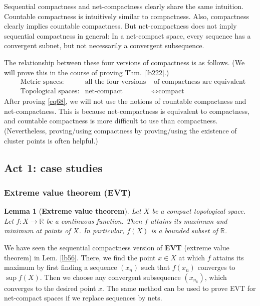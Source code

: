 \documentclass[12pt,b5paper,notitlepage]{article}
\theoremstyle{definition}
\theoremstyle{plain}
\newtheorem{lm}[df]{Lemma}
\newcommand{\Rbb}{\mathbb R}
\numberwithin{equation}{section}
\begin{document}
Sequential compactness and net-compactness clearly share the same intuition. Countable compactness is intuitively similar to compactness. Also, compactness clearly implies countable compactness. But net-compactness does not imply sequential compactness in general: In a net-compact space, every sequence has a convergent subnet, but not necessarily a convergent subsequence. 

The relationship between these four versions of compactness is as follows. (We will prove this in the course of proving Thm. \ref{lb222}.)
\begin{subequations}\label{eq68}
\begin{align}
&\text{Metric spaces:} & \text{all the four versions}&\text{ of compactness are equivalent}\\
&\text{Topological spaces:} & \text{net-compact}&\Longleftrightarrow\text{compact}
\end{align}
\end{subequations}
After proving \eqref{eq68}, we will not use the notions of countable compactness and net-compactness. This is because net-compactness is equivalent to compactness, and countable compactness is more difficult to use than compactness. (Nevertheless, proving/using compactness by proving/using the existence of cluster points is often helpful.)




\subsection{Act 1: case studies}\label{lb293}



\subsubsection{Extreme value theorem (EVT)}

\begin{lm}[\textbf{Extreme value theorem}]\label{lb224} 
Let $X$ be a compact topological space. Let $f:X\rightarrow\Rbb$ be a continuous function. Then $f$ attains its maximum and minimum at points of $X$. In particular, $f(X)$ is a bounded subset of $\Rbb$.
\end{lm}



We have seen the sequential compactness version of \textbf{EVT} (extreme value theorem) in Lem. \ref{lb56}. There, we find the point $x\in X$ at which $f$ attains its maximum by first finding a sequence $(x_n)$ such that $f(x_n)$ converges to $\sup f(X)$. Then we choose any convergent subsequence $(x_{n_k})$, which converges to the desired point $x$. The same method can be used to prove EVT for net-compact spaces if we replace sequences by nets.
\end{document}
